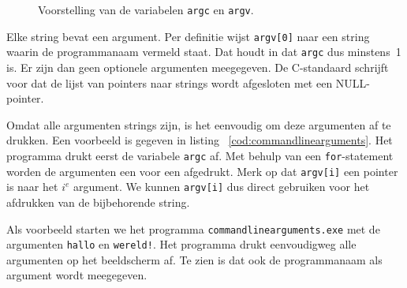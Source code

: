 \begin{figure}[!ht]
\centering
{}
\caption{Voorstelling van de variabelen \texttt{argc} en \texttt{argv}.}
\label{fig:poiargcargv}
\end{figure}

Elke string bevat een argument. Per definitie wijst \texttt{argv[0]} naar een string waarin de programmanaam vermeld staat. Dat houdt in dat \texttt{argc} dus minstens~1 is. Er zijn dan geen optionele argumenten meegegeven. De C-standaard schrijft voor dat de lijst van pointers naar strings wordt afgesloten met een NULL-pointer.

Omdat alle argumenten strings zijn, is het eenvoudig om deze argumenten af te drukken. Een voorbeeld is gegeven in listing ~\ref{cod:commandlinearguments}. Het programma drukt eerst de variabele \texttt{argc} af. Met behulp van een \texttt{for}-statement worden de argumenten een voor een afgedrukt. Merk op dat \texttt{argv[i]} een pointer is naar het $i^e$ argument. We kunnen \texttt{argv[i]} dus direct gebruiken voor het afdrukken van de bijbehorende string.



Als voorbeeld starten we het programma \texttt{commandlinearguments.exe} met de argumenten \texttt{hallo} en \texttt{wereld!}. Het programma drukt eenvoudigweg alle argumenten op het beeldscherm af. Te zien is dat ook de programmanaam als argument wordt meegegeven.

